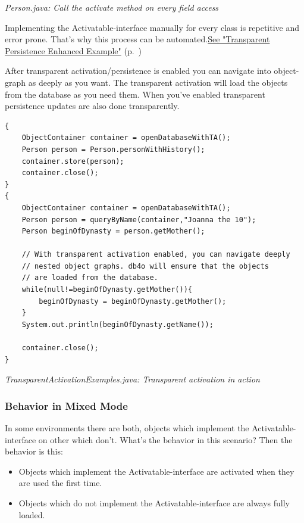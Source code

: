 {\small\itshape Person.java: Call the activate method on every field access\par}
\medskip

Implementing the Activatable-interface manually for every class is repetitive and error prone. That's why this process can be automated.\hyperref[ref:basics-transparentpersistence-ta-enhanced-example]{See "Transparent Persistence Enhanced Example"} (p.~\pageref{ref:basics-transparentpersistence-ta-enhanced-example})

After transparent activation/persistence is enabled you can navigate into object-graph as deeply as you want. The transparent activation will load the objects from the database as you need them. When you've enabled transparent persistence updates are also done transparently.

\begin{lstlisting}
{
    ObjectContainer container = openDatabaseWithTA();
    Person person = Person.personWithHistory();
    container.store(person);
    container.close();
}
{
    ObjectContainer container = openDatabaseWithTA();
    Person person = queryByName(container,"Joanna the 10");
    Person beginOfDynasty = person.getMother();

    // With transparent activation enabled, you can navigate deeply
    // nested object graphs. db4o will ensure that the objects
    // are loaded from the database.
    while(null!=beginOfDynasty.getMother()){
        beginOfDynasty = beginOfDynasty.getMother();
    }
    System.out.println(beginOfDynasty.getName());
    
    container.close();
}
\end{lstlisting}

{\small\itshape TransparentActivationExamples.java: Transparent activation in action\par}
\medskip

\subsubsection{Behavior in Mixed Mode}
\label{ref:basics-transparentpersistence-implementation:behavior}

In some environments there are both, objects which implement the Activatable-interface on other which don't. What's the behavior in this scenario? Then the behavior is this:

\begin{itemize}
\item Objects which implement the Activatable-interface are activated when they are used the first time.
\item Objects which do not implement the Activatable-interface are always fully loaded.
\end{itemize}

